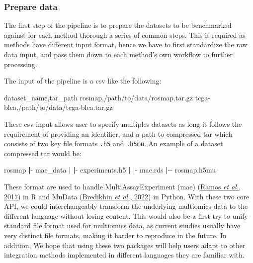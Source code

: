 \documentclass[
]{article}
\newenvironment{Shaded}{\begin{snugshade}}{\end{snugshade}}
\newcommand{\ExtensionTok}[1]{#1}
\newcommand{\KeywordTok}[1]{\textcolor[rgb]{0.13,0.29,0.53}{\textbf{#1}}}
\newcommand{\NormalTok}[1]{#1}
\begin{document}
\hypertarget{prepare-data}{%
\subsubsection{Prepare data}\label{prepare-data}}

The first step of the pipeline is to prepare the datasets to be benchmarked against for each method thorough a series of common steps. This is required as methods have different input format, hence we have to first standardize the raw data input, and pass them down to each method's own workflow to further processing.

The input of the pipeline is a csv like the following:

\begin{Shaded}
\begin{Highlighting}[]
\NormalTok{dataset\_name,tar\_path}
\NormalTok{rosmap,/path/to/data/rosmap.tar.gz}
\NormalTok{tcga{-}blca,/path/to/data/tcga{-}blca.tar.gz}
\end{Highlighting}
\end{Shaded}

These csv input allows user to specify multiples datasets as long it follows the requirement of providing an identifier, and a path to compressed tar which consists of two key file formats \texttt{.h5} and \texttt{.h5mu}. An example of a dataset compressed tar would be:

\begin{Shaded}
\begin{Highlighting}[]
\ExtensionTok{rosmap}
\KeywordTok{|}\ExtensionTok{{-}}\NormalTok{ mae\_data}
\KeywordTok{|}   \KeywordTok{|}\ExtensionTok{{-}}\NormalTok{ experiments.h5}
\KeywordTok{|}   \KeywordTok{|}\ExtensionTok{{-}}\NormalTok{ mae.rds}
\KeywordTok{|}\ExtensionTok{{-}{-}}\NormalTok{ rosmap.h5mu}
\end{Highlighting}
\end{Shaded}

These format are used to handle MultiAssayExperiment (mae) (\protect\hyperlink{ref-ramos2017software}{Ramos \emph{et al.}, 2017}) in R and MuData (\protect\hyperlink{ref-bredikhin2022muon}{Bredikhin \emph{et al.}, 2022}) in Python. With these two core API, we could interchangeably transform the underlying multiomics data to the different language without losing content. This would also be a first try to unify standard file format used for multiomics data, as current studies usually have very distinct file formats, making it harder to reproduce in the future. In addition, We hope that using these two packages will help users adapt to other integration methods implemented in different languages they are familiar with.
\end{document}
